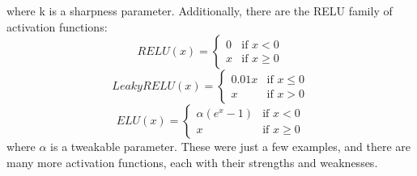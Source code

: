 \documentclass{article}
\begin{document}
where k is a sharpness parameter. \newline
Additionally, there are the RELU family of activation functions:
\begin{equation}
    RELU(x) = \begin{cases}
                                   0 & \text{if $x<0$} \\
                                   x & \text{if $x\geq0$}
  \end{cases}
\end{equation}
\begin{equation}
    Leaky RELU(x) = \begin{cases}
                                   0.01x & \text{if $x\leq0$} \\
                                   x & \text{if $x>0$}
  \end{cases}
\end{equation}
\begin{equation}
    ELU(x) = \begin{cases}
                                   \alpha(e^{x} - 1) & \text{if $x<0$} \\
                                   x & \text{if $x\geq 0$}
  \end{cases}
\end{equation}
where $\alpha$ is a tweakable parameter. \newline
These were just a few examples, and there are many more activation functions, each with their strengths and weaknesses. \newpage
\end{document}
